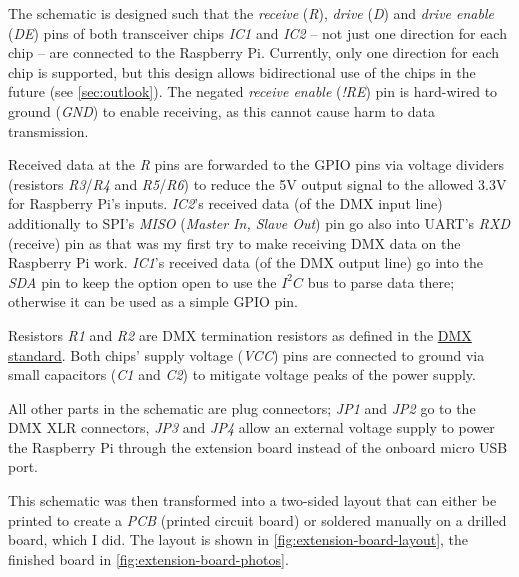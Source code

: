 The schematic is designed such that the \emph{receive} (\emph{R}),
\emph{drive} (\emph{D}) and \emph{drive enable} (\emph{DE}) pins of both
transceiver chips \emph{IC1} and \emph{IC2} -- not just one direction
for each chip -- are connected to the Raspberry Pi. Currently, only one
direction for each chip is supported, but this design allows
bidirectional use of the chips in the future (see \cref{sec:outlook}).
The negated \emph{receive enable} (\emph{!RE}) pin is hard-wired to
ground (\emph{GND}) to enable receiving, as this cannot cause harm to
data transmission.

Received data at the \emph{R} pins are forwarded to the GPIO pins via
voltage dividers (resistors \emph{R3}/\emph{R4} and \emph{R5}/\emph{R6})
to reduce the 5V output signal to the allowed 3.3V for Raspberry Pi's
inputs. \emph{IC2}'s received data (of the DMX input line) additionally
to SPI's \emph{MISO} (\emph{Master In, Slave Out}) pin go also into
UART's \emph{RXD} (receive) pin as that was my first try to make
receiving DMX data on the Raspberry Pi work. \emph{IC1}'s received data
(of the DMX output line) go into the \emph{SDA} pin to keep the option
open to use the \(I^2C\) bus to parse data there; otherwise it can be
used as a simple GPIO pin.

Resistors \emph{R1} and \emph{R2} are DMX termination resistors as
defined in the \protect\hyperlink{sec:dmx-electrical}{DMX standard}.
Both chips' supply voltage (\emph{VCC}) pins are connected to ground via
small capacitors (\emph{C1} and \emph{C2}) to mitigate voltage peaks of
the power supply.

All other parts in the schematic are plug connectors; \emph{JP1} and
\emph{JP2} go to the DMX XLR connectors, \emph{JP3} and \emph{JP4} allow
an external voltage supply to power the Raspberry Pi through the
extension board instead of the onboard micro USB port.

This schematic was then
transformed into a two-sided layout that can either be printed to create
a \emph{PCB} (printed circuit board) or soldered manually on a drilled
board, which I did. The layout is shown in
\cref{fig:extension-board-layout}, the finished board in
\cref{fig:extension-board-photos}.

